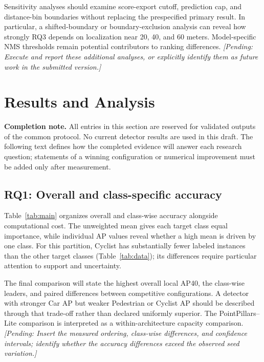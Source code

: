 \documentclass[10pt,twocolumn]{article}
\newcommand{\pending}[1]{\textcolor{blue!55!black}{\textit{[Pending: #1]}}}
\begin{document}
Sensitivity analyses should examine score-export cutoff, prediction cap, and distance-bin boundaries without replacing the prespecified primary result. In particular, a shifted-boundary or boundary-exclusion analysis can reveal how strongly RQ3 depends on localization near 20, 40, and 60 meters. Model-specific NMS thresholds remain potential contributors to ranking differences. \pending{Execute and report these additional analyses, or explicitly identify them as future work in the submitted version.}

\section{Results and Analysis}
\label{sec:results}
\textbf{Completion note.} All entries in this section are reserved for validated outputs of the common protocol. No current detector results are used in this draft. The following text defines how the completed evidence will answer each research question; statements of a winning configuration or numerical improvement must be added only after measurement.

\subsection{RQ1: Overall and class-specific accuracy}
Table~\ref{tab:main} organizes overall and class-wise accuracy alongside computational cost. The unweighted mean gives each target class equal importance, while individual AP values reveal whether a high mean is driven by one class. For this partition, Cyclist has substantially fewer labeled instances than the other target classes (Table~\ref{tab:data}); its differences require particular attention to support and uncertainty.

The final comparison will state the highest overall local AP40, the class-wise leaders, and paired differences between competitive configurations. A detector with stronger Car AP but weaker Pedestrian or Cyclist AP should be described through that trade-off rather than declared uniformly superior. The PointPillars--Lite comparison is interpreted as a within-architecture capacity comparison. \pending{Insert the measured ordering, class-wise differences, and confidence intervals; identify whether the accuracy differences exceed the observed seed variation.}
\end{document}
